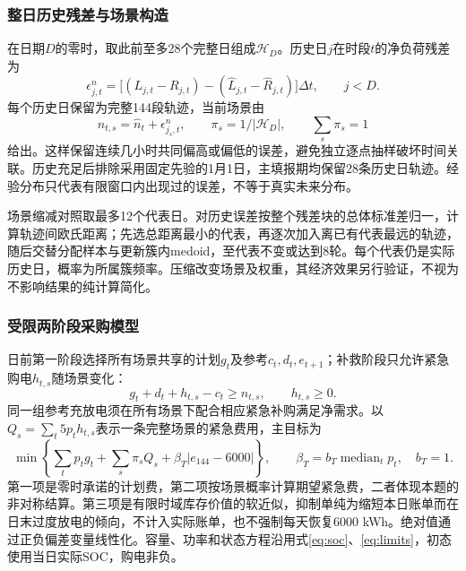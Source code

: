 \subsubsection{整日历史残差与场景构造}

在日期$D$的零时，取此前至多28个完整日组成$\mathcal H_D$。历史日$j$在时段$t$的净负荷残差为
\begin{equation}
 \epsilon^n_{j,t}=
 \big[(L_{j,t}-R_{j,t})-(\widehat L_{j,t}-\widehat R_{j,t})\big]\Delta t,
 \qquad j<D.
 \label{eq:residual}
\end{equation}
每个历史日保留为完整144段轨迹，当前场景由
\begin{equation}
 n_{t,s}=\widehat n_t+\epsilon^n_{j_s,t},\qquad
 \pi_s=1/|\mathcal H_D|,\qquad \sum_s\pi_s=1
 \label{eq:q2_empirical_scenarios}
\end{equation}
给出。这样保留连续几小时共同偏高或偏低的误差，避免独立逐点抽样破坏时间关联。历史充足后排除采用固定先验的1月1日，主填报期均保留28条历史日轨迹。经验分布只代表有限窗口内出现过的误差，不等于真实未来分布。

场景缩减对照取最多12个代表日。对历史误差按整个残差块的总体标准差归一，计算轨迹间欧氏距离；先选总距离最小的代表，再逐次加入离已有代表最远的轨迹，随后交替分配样本与更新簇内medoid，至代表不变或达到8轮。每个代表仍是实际历史日，概率为所属簇频率。压缩改变场景及权重，其经济效果另行验证，不视为不影响结果的纯计算简化。

\subsubsection{受限两阶段采购模型}

日前第一阶段选择所有场景共享的计划$g_t$及参考$c_t,d_t,e_{t+1}$；补救阶段只允许紧急购电$h_{t,s}$随场景变化：
\begin{equation}
 g_t+d_t+h_{t,s}-c_t\ge n_{t,s},\qquad h_{t,s}\ge0.
 \label{eq:scenario_balance}
\end{equation}
同一组参考充放电须在所有场景下配合相应紧急补购满足净需求。以
$Q_s=\sum_t5p_th_{t,s}$表示一条完整场景的紧急费用，主目标为
\begin{equation}
 \min\left\{\sum_tp_tg_t+\sum_s\pi_sQ_s+
 \beta_T|e_{144}-6000|\right\},\qquad
 \beta_T=b_T\operatorname{median}_{t}p_t,\quad b_T=1.
 \label{eq:q2_objective}
\end{equation}
第一项是零时承诺的计划费，第二项按场景概率计算期望紧急费，二者体现本题的非对称结算。第三项是有限时域库存价值的软近似，抑制单纯为缩短本日账单而在日末过度放电的倾向，不计入实际账单，也不强制每天恢复6000 kWh。绝对值通过正负偏差变量线性化。容量、功率和状态方程沿用式\eqref{eq:soc}、\eqref{eq:limits}，初态使用当日实际SOC，购电非负。

